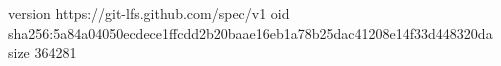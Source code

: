 version https://git-lfs.github.com/spec/v1
oid sha256:5a84a04050ecdece1ffcdd2b20baae16eb1a78b25dac41208e14f33d448320da
size 364281
